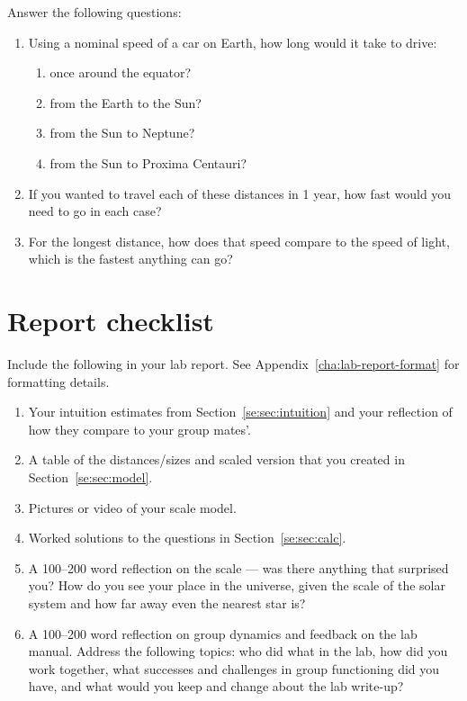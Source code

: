 Answer the following questions:
\begin{enumerate}
	\item Using a nominal speed of a car on Earth, how long would it take to drive:
	\begin{enumerate}
		\item once around the equator?
		\item from the Earth to the Sun?
		\item from the Sun to Neptune?
		\item from the Sun to Proxima Centauri?
	\end{enumerate}
	\item If you wanted to travel each of these distances in 1 year, how fast would you need to go in each case?
	\item For the longest distance, how does that speed compare to the speed of light, which is the fastest anything can go?
\end{enumerate}

\section{Report checklist}

Include the following in your lab report. See Appendix~\ref{cha:lab-report-format} for formatting details.

\begin{enumerate}
	\item Your intuition estimates from Section~\ref{se:sec:intuition} and your reflection of how they compare to your group mates'.
	\item A table of the distances/sizes and scaled version that you created in Section~\ref{se:sec:model}.
	\item Pictures or video of your scale model.
	\item Worked solutions to the questions in Section~\ref{se:sec:calc}.
	\item A 100--200 word reflection on the scale --- was there anything that surprised you? How do you see your place in the universe, given the scale of the solar system and how far away even the nearest star is?
	\item A 100--200 word reflection on group dynamics and feedback on the lab manual. Address the following topics: who did what in the lab, how did you work together, what successes and challenges in group functioning did you have, and what would you keep and change about the lab write-up?
\end{enumerate}
